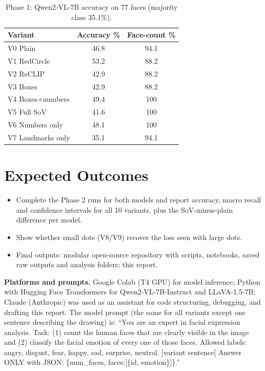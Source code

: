 \documentclass[lettersize,journal]{IEEEtran}
\begin{document}
\begin{table}[!t]
\caption{Phase 1: Qwen2-VL-7B accuracy on 77 faces (majority class 35.1\%).\label{tab:table1}}
\centering
\begin{tabular}{|l|c|c|}
\hline
Variant & Accuracy \% & Face-count \% \\
\hline
V0 Plain & 46.8 & 94.1 \\
V1 RedCircle & 53.2 & 88.2 \\
V2 ReCLIP & 42.9 & 88.2 \\
V3 Boxes & 42.9 & 88.2 \\
V4 Boxes+numbers & 49.4 & 100 \\
V5 Full SoV & 41.6 & 100 \\
V6 Numbers only & 48.1 & 100 \\
V7 Landmarks only & 35.1 & 94.1 \\
\hline
\end{tabular}
\end{table}

\section{Expected Outcomes}
\begin{itemize}
    \item Complete the Phase 2 runs for both models and report accuracy, macro recall and confidence intervals for all 10 variants, plus the SoV-minus-plain difference per model.
    \item Show whether small dots (V8/V9) recover the loss seen with large dots.
    \item Final outputs: modular open-source repository with scripts, notebooks, saved raw outputs and analysis folders; this report.
\end{itemize}

\nocite{lecun2015deep}
\nocite{vaswani2017attention}




{\appendix
\textbf{Platforms and prompts.} Google Colab (T4 GPU) for model inference; Python with Hugging Face Transformers for Qwen2-VL-7B-Instruct and LLaVA-1.5-7B; Claude (Anthropic) was used as an assistant for code structuring, debugging, and drafting this report. The model prompt (the same for all variants except one sentence describing the drawing) is: ``You are an expert in facial expression analysis. Task: (1) count the human faces that are clearly visible in the image and (2) classify the facial emotion of every one of those faces. Allowed labels: angry, disgust, fear, happy, sad, surprise, neutral. [variant sentence] Answer ONLY with JSON: \{num\_faces, faces:[\{id, emotion\}]\}.''}
\end{document}
